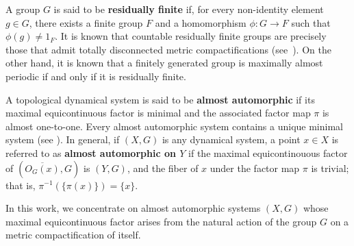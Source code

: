 \documentclass[titlepage,reqno,10pt]{amsart}
\theoremstyle{definition}
\begin{document}
A group $G$ is said to be \textbf{residually finite} if, for every non-identity element $g \in G$, there exists a finite group $F$ and a homomorphism $\phi: G \to F$ such that $\phi(g) \neq 1_F$. It is known that countable residually finite groups are precisely those that admit totally disconnected metric compactifications (see~\cite[Lemma~2.1]{CeCoGo23}).  On the other hand, it is known that a finitely generated group is maximally almost periodic if and only if it is residually finite.

A topological dynamical system is said to be \textbf{almost automorphic} if its maximal equicontinuous factor is minimal and the associated factor map $\pi$ is almost one-to-one. Every almost automorphic system contains a unique minimal system (see \cite{FK18}). In general, if $(X,G)$ is any dynamical system, a point $x\in X$   is referred to as \textbf{almost automorphic on $Y$} if 
the maximal equicontinouous factor  of $(\overline{O_G(x)},G)$ is $(Y,G)$, and the fiber of $x$ under the factor map $\pi$ is trivial; that is, $\pi^{-1}(\{\pi(x)\}) = \{x\}$.  %
 

In this work, we concentrate on almost automorphic systems $(X,G)$ whose maximal equicontinuous factor arises from the natural action of the group $G$ on a metric com\-pac\-ti\-fi\-ca\-tion of itself.  

 
  






 

\end{document}
